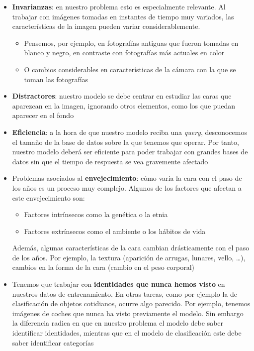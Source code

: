 \begin{itemize}
    \item \textbf{Invarianzas}: en nuestro problema esto es especialmente relevante. Al trabajar con imágenes tomadas en instantes de tiempo muy variados, las características de la imagen pueden variar considerablemente.
        \begin{itemize}
            \item Pensemos, por ejemplo, en fotografías antiguas que fueron tomadas en blanco y negro, en contraste con fotografías más actuales en color
            \item O cambios considerables en características de la cámara con la que se toman las fotografías
        \end{itemize}
    \item \textbf{Distractores}: nuestro modelo se debe centrar en estudiar las caras que aparezcan en la imagen, ignorando otros elementos, como los que puedan aparecer en el fondo
    \item \textbf{Eficiencia}: a la hora de que nuestro modelo reciba una \textit{query}, desconocemos el tamaño de la base de datos sobre la que tenemos que operar. Por tanto, nuestro modelo deberá ser eficiente para poder trabajar con grandes bases de datos sin que el tiempo de respuesta se vea gravemente afectado
    \item Problemas asociados al \textbf{envejecimiento}: cómo varía la cara con el paso de los años es un proceso muy complejo. Algunos de los factores que afectan a este envejecimiento \cite{informatica:tecnica_sintesis_aifr} son:
        \begin{itemize}
            \item Factores intrínsecos como la genética o la etnia
            \item Factores extrínsecos como el ambiente o los hábitos de vida
        \end{itemize}
    Además, algunas características de la cara cambian drásticamente con el paso de los años. Por ejemplo, la textura (aparición de arrugas, lunares, vello, \ldots), cambios en la forma de la cara (cambio en el peso corporal)

\item Tenemos que trabajar con \textbf{identidades que nunca hemos visto} en nuestros datos de entrenamiento. En otras tareas, como por ejemplo la de clasificación de objetos cotidianos, ocurre algo parecido. Por ejemplo, tenemos imágenes de coches que nunca ha visto previamente el modelo. Sin embargo la diferencia radica en que en nuestro problema el modelo debe saber identificar identidades, mientras que en el modelo de clasificación este debe saber identificar categorías


\end{itemize}
